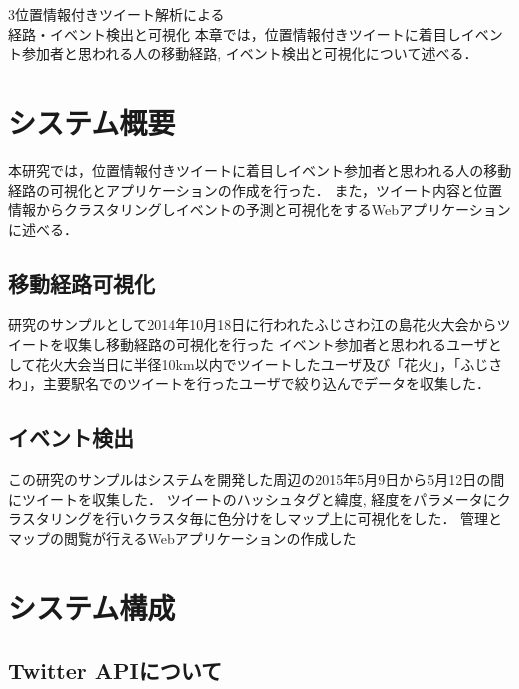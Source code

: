 \chapterhead
{3}{位置情報付きツイート解析による\\
経路・イベント検出と可視化}
{本章では，位置情報付きツイートに着目しイベント参加者と思われる人の移動経路, イベント検出と可視化について述べる．}


\section{システム概要}
本研究では，位置情報付きツイートに着目しイベント参加者と思われる人の移動経路の可視化とアプリケーションの作成を行った．
また，ツイート内容と位置情報からクラスタリングしイベントの予測と可視化をするWebアプリケーションに述べる．

\subsection{移動経路可視化}
研究のサンプルとして2014年10月18日に行われたふじさわ江の島花火大会\cite{webpage_fujisawa}からツイートを収集し移動経路の可視化を行った
イベント参加者と思われるユーザとして花火大会当日に半径10km以内でツイートしたユーザ及び「花火」，「ふじさわ」，主要駅名でのツイートを行ったユーザで絞り込んでデータを収集した．


\subsection{イベント検出}
この研究のサンプルはシステムを開発した周辺の2015年5月9日から5月12日の間にツイートを収集した．
ツイートのハッシュタグと緯度, 経度をパラメータにクラスタリングを行いクラスタ毎に色分けをしマップ上に可視化をした．
管理とマップの閲覧が行えるWebアプリケーションの作成した



\newpage

\section{システム構成}
\subsection{Twitter APIについて}
